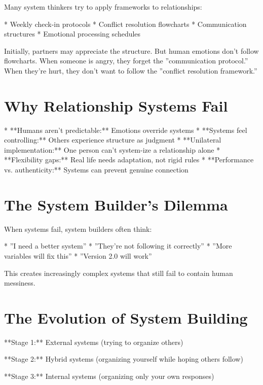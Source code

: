 \documentclass[12pt,oneside]{book}
\begin{document}
Many system thinkers try to apply frameworks to relationships:

                    * Weekly check-in protocols
                    * Conflict resolution flowcharts
                    * Communication structures
                    * Emotional processing schedules

Initially, partners may appreciate the structure. But human emotions don't follow flowcharts. When someone is angry, they forget the ''communication protocol.'' When they're hurt, they don't want to follow the ''conflict resolution framework.''

\section{Why Relationship Systems Fail}

                    * **Humans aren't predictable:** Emotions override systems
                    * **Systems feel controlling:** Others experience structure as judgment
                    * **Unilateral implementation:** One person can't system-ize a relationship alone
                    * **Flexibility gaps:** Real life needs adaptation, not rigid rules
                    * **Performance vs. authenticity:** Systems can prevent genuine connection

\section{The System Builder's Dilemma}

When systems fail, system builders often think:

                    * ''I need a better system''
                    * ''They're not following it correctly''
                    * ''More variables will fix this''
                    * ''Version 2.0 will work''

This creates increasingly complex systems that still fail to contain human messiness.

\section{The Evolution of System Building}

**Stage 1:** External systems (trying to organize others)

                **Stage 2:** Hybrid systems (organizing yourself while hoping others follow)

                **Stage 3:** Internal systems (organizing only your own responses)
\end{document}
